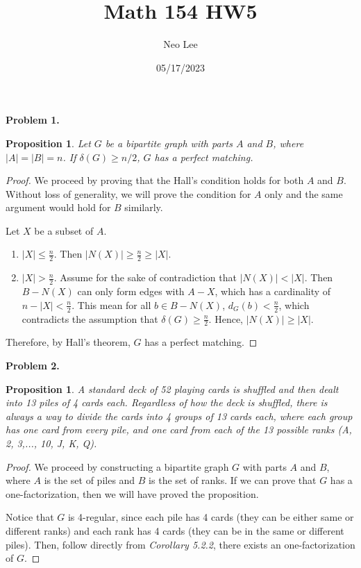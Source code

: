 \documentclass{article}
\title{Math 154 HW5}
\author{Neo Lee}
\date{05/17/2023}
\newtheorem{prop}[thm]{Proposition}
\begin{document}
 

\maketitle 

\textbf{Problem 1.}
\begin{prop}
    Let $G$ be a bipartite graph with parts $A$ and $B$, where $|A| = |B| = n$. If $\delta(G) \ge n/2$, $G$ has a perfect matching.
\end{prop}
\begin{proof}
    We proceed by proving that the Hall's condition holds for both $A$ and $B$. Without loss of generality, we will prove the condition for $A$ only and the same argument would hold for $B$ similarly.

    Let $X$ be a subset of $A$.
    \begin{enumerate}[label=Case \arabic*:]
        \item $|X| \le \frac{n}{2}$. Then $|N(X)| \ge \frac{n}{2} \ge |X|$.
        \item $|X| > \frac{n}{2}$. Assume for the sake of contradiction that $|N(X)| < |X|$. 
        Then $B - N(X)$ can only form edges with $A - X$, which has a cardinality of $n - |X| < \frac{n}{2}$.
        This mean for all $b \in B - N(X)$, $d_G(b) < \frac{n}{2}$, which contradicts the assumption that $\delta(G) \ge \frac{n}{2}$.
        Hence, $|N(X)| \ge |X|$.
    \end{enumerate}

    Therefore, by Hall's theorem, $G$ has a perfect matching.
\end{proof}
\bigbreak

\textbf{Problem 2.}
\begin{prop}
    A standard deck of 52 playing cards is shuffled and then dealt into 13 piles of 4 cards each. Regardless of how the deck is shuffled, there is always a way to divide the cards into 4 groups of 13 cards each, where each group has one card from every pile, and one card from each of the 13 possible ranks (A, 2, 3,..., 10, J, K, Q).
\end{prop}
\begin{proof}
    We proceed by constructing a bipartite graph $G$ with parts $A$ and $B$, where $A$ is the set of piles and $B$ is the set of ranks.
    If we can prove that $G$ has a one-factorization, then we will have proved the proposition.

    Notice that $G$ is 4-regular, since each pile has 4 cards (they can be either same or different ranks) and each rank has 4 cards (they can be in the same or different piles).
    Then, follow directly from \emph{Corollary 5.2.2}, there exists an one-factorization of $G$.
\end{proof}
\bigbreak
\end{document}
